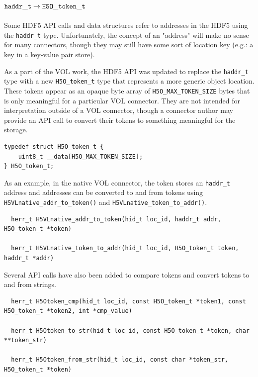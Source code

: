 \subsection{${\tt haddr\_t} \rightarrow {\tt H5O\_token\_t}$}

Some HDF5 API calls and data structures refer to addresses in the HDF5 using the {\tt haddr\_t} type.
Unfortunately, the concept of an "address" will make no sense for many connectors,
though they may still have some sort of location key (e.g.: a key in a key-value
pair store).

As a part of the VOL work, the HDF5 API was updated to replace the {\tt haddr\_t}
type with a new {\tt H5O\_token\_t} type that represents a more generic object location.
These tokens appear as an opaque byte array of {\tt H5O\_MAX\_TOKEN\_SIZE} bytes that
is only meaningful for a particular VOL connector. They are not intended for
interpretation outside of a VOL connector, though a connector author may provide
an API call to convert their tokens to something meaningful for the storage.

\begin{lstlisting}
typedef struct H5O_token_t {                                                     
    uint8_t __data[H5O_MAX_TOKEN_SIZE];                                          
} H5O_token_t;
\end{lstlisting}

As an example, in the native VOL connector, the token stores an {\tt haddr\_t}
address and addresses can be converted to and from tokens using
{\tt H5VLnative\_addr\_to\_token()} and {\tt H5VLnative\_token\_to\_addr()}.

\begin{lstlisting}
  herr_t H5VLnative_addr_to_token(hid_t loc_id, haddr_t addr, H5O_token_t *token)

  herr_t H5VLnative_token_to_addr(hid_t loc_id, H5O_token_t token, haddr_t *addr)
\end{lstlisting}

Several API calls have also been added to compare tokens and convert tokens to
and from strings.

\begin{lstlisting}
  herr_t H5Otoken_cmp(hid_t loc_id, const H5O_token_t *token1, const H5O_token_t *token2, int *cmp_value)

  herr_t H5Otoken_to_str(hid_t loc_id, const H5O_token_t *token, char **token_str)

  herr_t H5Otoken_from_str(hid_t loc_id, const char *token_str, H5O_token_t *token)
\end{lstlisting}


